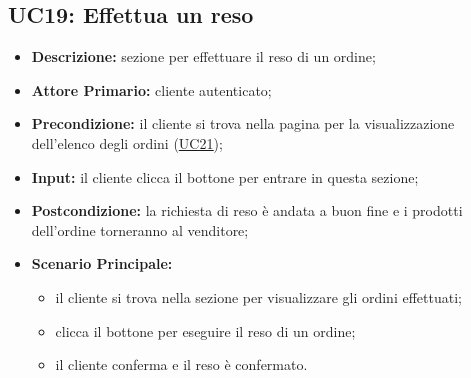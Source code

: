 \subsection{UC19: Effettua un reso}
\label{sec:UC19}
\begin{itemize}
    \item \textbf{Descrizione:} sezione per effettuare il reso di un ordine;
    \item \textbf{Attore Primario:} cliente autenticato;
    \item \textbf{Precondizione:} il cliente si trova nella pagina per la visualizzazione dell'elenco degli ordini (\hyperref[sec:UC21]{\underline{UC21}});
    \item \textbf{Input:} il cliente clicca il bottone per entrare in questa sezione;
    \item \textbf{Postcondizione:} la richiesta di reso è andata a buon fine e i prodotti dell'ordine torneranno al venditore;
    \item \textbf{Scenario Principale:}
        \begin{itemize}
            \item il cliente si trova nella sezione per visualizzare gli ordini effettuati;
            \item clicca il bottone per eseguire il reso di un ordine;
            \item il cliente conferma e il reso è confermato.
        \end{itemize}
\end{itemize}